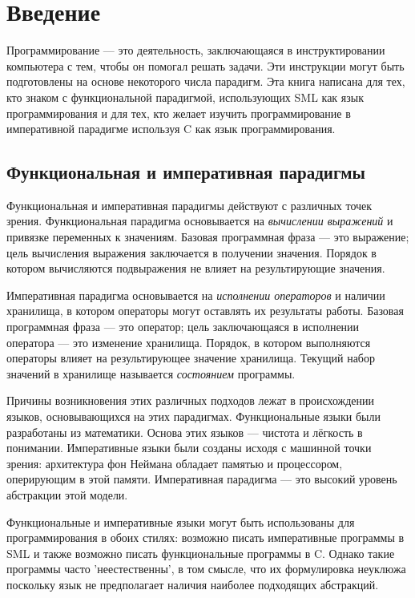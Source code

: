 \chapter{Введение}
Программирование --- это деятельность, заключающаяся в инструктировании компьютера с тем, чтобы он помогал решать задачи. Эти инструкции могут быть подготовлены на основе некоторого числа парадигм. Эта книга написана для тех, кто знаком с функциональной парадигмой, использующих SML как язык программирования и для тех, кто желает изучить программирование в императивной парадигме используя C как язык программирования.

\section{Функциональная и императивная парадигмы}

Функциональная и императивная парадигмы действуют с различных точек зрения. Функциональная парадигма основывается на \emph{вычислении выражений} и привязке переменных к значениям. Базовая программная фраза --- это выражение; цель вычисления выражения заключается в получении значения. Порядок в котором вычисляются подвыражения не влияет на результирующие значения.

Императивная парадигма основывается на \emph{исполнении операторов} и наличии хранилища, в котором операторы могут оставлять их результаты работы. Базовая программная фраза --- это оператор; цель заключающаяся в исполнении оператора --- это изменение хранилища. Порядок, в котором выполняются операторы влияет на результирующее значение хранилища. Текущий набор значений в хранилище называется \emph{состоянием} программы.

Причины возникновения этих различных подходов лежат в происхождении языков, основывающихся на этих парадигмах. Функциональные языки были разработаны из математики. Основа этих языков --- чистота и лёгкость в понимании. Императивные языки были созданы исходя с машинной точки зрения: архитектура фон Неймана обладает памятью и процессором, оперирующим в этой памяти. Императивная парадигма --- это высокий уровень абстракции этой модели.

Функциональные и императивные языки могут быть использованы для программирования в обоих стилях: возможно писать императивные программы в SML и также возможно писать функциональные программы в C. Однако такие программы часто 'неестественны', в том смысле, что их формулировка неуклюжа поскольку язык не предполагает наличия наиболее подходящих абстракций.


